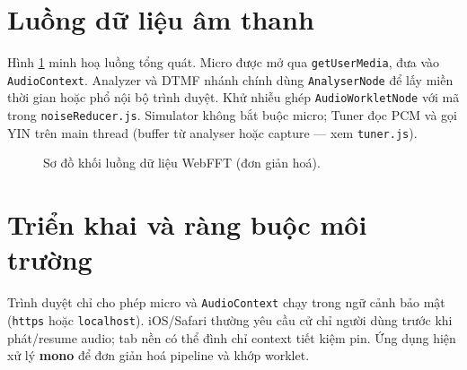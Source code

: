 \section{Luồng dữ liệu âm thanh}
Hình \ref{fig:arch-webfft} minh hoạ luồng tổng quát. Micro được mở qua \texttt{getUserMedia}, đưa vào \texttt{AudioContext}. Analyzer và DTMF nhánh chính dùng \texttt{AnalyserNode} để lấy miền thời gian hoặc phổ nội bộ trình duyệt. Khử nhiễu ghép \texttt{AudioWorkletNode} với mã trong \verb|noiseReducer.js|. Simulator không bắt buộc micro; Tuner đọc PCM và gọi YIN trên main thread (buffer từ analyser hoặc capture --- xem \verb|tuner.js|).

\begin{figure}[htbp]
	\centering
	\caption{Sơ đồ khối luồng dữ liệu WebFFT (đơn giản hoá).}
	\label{fig:arch-webfft}
\end{figure}

\section{Triển khai và ràng buộc môi trường}
Trình duyệt chỉ cho phép micro và \texttt{AudioContext} chạy trong ngữ cảnh bảo mật (\texttt{https} hoặc \texttt{localhost}). iOS/Safari thường yêu cầu cử chỉ người dùng trước khi phát/resume audio; tab nền có thể đình chỉ context tiết kiệm pin. Ứng dụng hiện xử lý \textbf{mono} để đơn giản hoá pipeline và khớp worklet.
